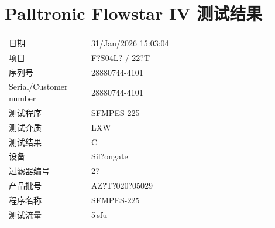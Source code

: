 \documentclass[UTF8,10pt,a4paper,fontset=fandol]{ctexart}
\newcommand{\fieldvalue}[1]{#1}
\begin{document}

\newpage

\section{Palltronic Flowstar IV 测试结果}

\begin{tabular}{@{}p{0.28\linewidth}p{0.62\linewidth}@{}}
日期 &
\fieldvalue{31/Jan/2026 15:03:04}
\\[2pt]

项目 &
\fieldvalue{F?S04L? / 22?T}
\\[2pt]

序列号 &
\fieldvalue{28880744-4101}
\\[2pt]

Serial/Customer number &
\fieldvalue{28880744-4101}
\\[2pt]

测试程序 &
\fieldvalue{SFMPES-225}
\\[2pt]

测试介质 &
\fieldvalue{LXW}
\\[2pt]

测试结果 &
\fieldvalue{C}
\\[2pt]

设备 &
\fieldvalue{Sil?ongate}
\\[2pt]

过滤器编号 &
\fieldvalue{2?}
\\[2pt]

产品批号 &
\fieldvalue{AZ?T?020?05029}
\\[2pt]

程序名称 &
\fieldvalue{SFMPES-225}
\\[2pt]

测试流量 &
\fieldvalue{5\,sfu}
\\[2pt]


\end{tabular}
\end{document}
